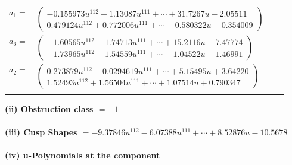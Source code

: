 \documentclass[1p]{elsarticle_modified}
\theoremstyle{definition}
\begin{document}
\begin{tabular}{m{7pt} m{180pt} m{7pt} m{180pt} }
\flushright $a_{1}=$&$\begin{pmatrix}-0.155973 u^{112}-1.13087 u^{111}+\cdots+31.7267 u-2.05511\\0.479124 u^{112}+0.772006 u^{111}+\cdots-0.580322 u-0.354009\end{pmatrix}$ \\
\flushright $a_{6}=$&$\begin{pmatrix}-1.60565 u^{112}-1.74713 u^{111}+\cdots+15.2116 u-7.47774\\-1.73965 u^{112}-1.54559 u^{111}+\cdots-1.04522 u-1.46991\end{pmatrix}$ \\
\flushright $a_{2}=$&$\begin{pmatrix}0.273879 u^{112}-0.0294619 u^{111}+\cdots+5.15495 u+3.64220\\1.52493 u^{112}+1.56504 u^{111}+\cdots+1.07514 u+0.790347\end{pmatrix}$\\&\end{tabular}
\flushleft \textbf{(ii) Obstruction class $= -1$}\\~\\
\flushleft \textbf{(iii) Cusp Shapes $= -9.37846 u^{112}-6.07388 u^{111}+\cdots+8.52876 u-10.5678$}\\~\\
\newpage\renewcommand{\arraystretch}{1}
\flushleft \textbf{(iv) u-Polynomials at the component}\newline \\
\end{document}
